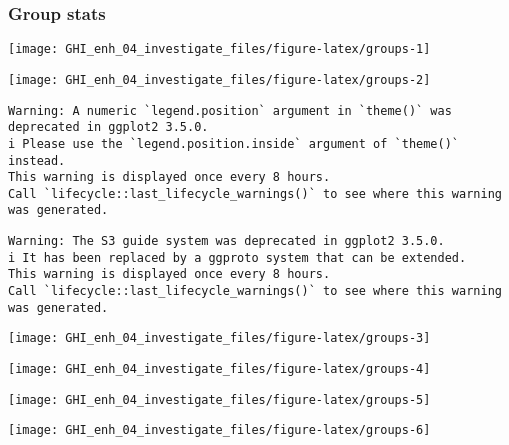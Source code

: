 \documentclass[
  10pt,
  a4paper,oneside]{article}
\begin{document}
\newpage
\FloatBarrier

\hypertarget{group-stats}{%
\subsubsection{Group stats}\label{group-stats}}

\begin{center}\texttt{[image: GHI\_enh\_04\_investigate\_files/figure-latex/groups-1]} \end{center}

\begin{center}\texttt{[image: GHI\_enh\_04\_investigate\_files/figure-latex/groups-2]} \end{center}

\begin{verbatim}
Warning: A numeric `legend.position` argument in `theme()` was deprecated in ggplot2 3.5.0.
i Please use the `legend.position.inside` argument of `theme()` instead.
This warning is displayed once every 8 hours.
Call `lifecycle::last_lifecycle_warnings()` to see where this warning was generated.
\end{verbatim}

\begin{verbatim}
Warning: The S3 guide system was deprecated in ggplot2 3.5.0.
i It has been replaced by a ggproto system that can be extended.
This warning is displayed once every 8 hours.
Call `lifecycle::last_lifecycle_warnings()` to see where this warning was generated.
\end{verbatim}

\begin{center}\texttt{[image: GHI\_enh\_04\_investigate\_files/figure-latex/groups-3]} \end{center}

\begin{center}\texttt{[image: GHI\_enh\_04\_investigate\_files/figure-latex/groups-4]} \end{center}

\begin{center}\texttt{[image: GHI\_enh\_04\_investigate\_files/figure-latex/groups-5]} \end{center}

\begin{center}\texttt{[image: GHI\_enh\_04\_investigate\_files/figure-latex/groups-6]} \end{center}
\end{document}
